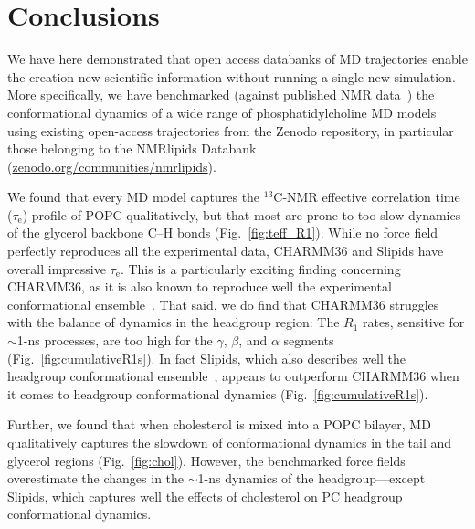 \documentclass[journal=jcisd8,manuscript=article,layout=twocolumn]{achemso}
\begin{document}
\section{Conclusions}
We have here demonstrated that
open access databanks of MD trajectories enable the creation new scientific information without running a single new simulation.
More specifically, we have bench\-marked (against published NMR data~\cite{ferreira15,pham15,Volke:1995a,Antila:2020a}) the conformational
dynamics of a wide range of phosphatidylcholine MD models using existing open-access trajectories from the Zenodo repository, in particular those belonging to the NMRlipids Databank (\url{zenodo.org/communities/nmrlipids}).

We found that every MD model captures the $^{13}$C-NMR effective correlation time ($\tau_\mathrm e$) profile of POPC qualitatively, %
but that most are prone to too slow dynamics of the glycerol backbone C--H bonds (Fig.~\ref{fig:teff_R1}).
%
While no force field perfectly reproduces all the experimental data,
CHARMM36 and Slipids have overall impressive $\tau_\mathrm e$.
This is a particularly exciting finding concerning CHARMM36, as it is also known to
reproduce well the experimental conformational ensemble~\cite{botan15}.
%
That said, we do find that CHARMM36 struggles with the balance of dynamics in the headgroup region:
The $R_1$ rates, sensitive for $\sim$1-ns processes, are too high for the $\gamma$, $\beta$, and $\alpha$ segments (Fig.~\ref{fig:cumulativeR1s}).
In fact Slipids, which also describes well the headgroup conformational ensemble~\cite{botan15},
appears to outperform CHARMM36 when it comes to headgroup conformational dynamics (Fig.~\ref{fig:cumulativeR1s}).

%
Further, we found that
when cholesterol is mixed into a POPC bilayer,
MD qualitatively captures the slowdown of conformational dynamics in the tail and glycerol regions (Fig.~\ref{fig:chol}). However, the benchmarked force fields overestimate the changes in the $\sim$1-ns dynamics of the headgroup---except
%
Slipids, which captures well the effects of cholesterol on PC headgroup conformational dynamics.
\end{document}
